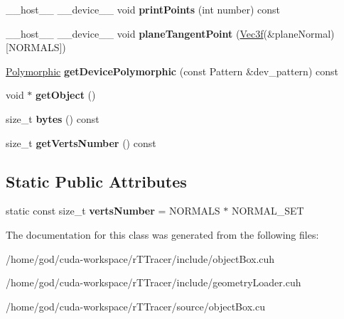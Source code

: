 \begin{DoxyCompactItemize}
\item 
\+\_\+\+\_\+host\+\_\+\+\_\+ \+\_\+\+\_\+device\+\_\+\+\_\+ void {\bfseries print\+Points} (int number) const\hypertarget{class_sphere_a80b41ffe0cbe37bc7a174e2e2c3cd12d}{}\label{class_sphere_a80b41ffe0cbe37bc7a174e2e2c3cd12d}

\item 
\+\_\+\+\_\+host\+\_\+\+\_\+ \+\_\+\+\_\+device\+\_\+\+\_\+ void {\bfseries plane\+Tangent\+Point} (\hyperlink{class_vec3}{Vec3f}(\&plane\+Normal)\mbox{[}N\+O\+R\+M\+A\+LS\mbox{]})\hypertarget{class_sphere_ae02b9577d4cfc6c2181caeafb6e7e09b}{}\label{class_sphere_ae02b9577d4cfc6c2181caeafb6e7e09b}

\item 
\hyperlink{struct_polymorphic}{Polymorphic} {\bfseries get\+Device\+Polymorphic} (const Pattern \&dev\+\_\+pattern) const\hypertarget{class_sphere_a3b912df967e257861160b74a11ae09ce}{}\label{class_sphere_a3b912df967e257861160b74a11ae09ce}

\item 
void $\ast$ {\bfseries get\+Object} ()\hypertarget{class_sphere_aa9a84f0893bc77fca4d9041f88bc40c3}{}\label{class_sphere_aa9a84f0893bc77fca4d9041f88bc40c3}

\item 
size\+\_\+t {\bfseries bytes} () const\hypertarget{class_sphere_a4653e693258cda646d795212b88d8104}{}\label{class_sphere_a4653e693258cda646d795212b88d8104}

\item 
size\+\_\+t {\bfseries get\+Verts\+Number} () const\hypertarget{class_sphere_a8381fa5f8257232a97614b155316b7eb}{}\label{class_sphere_a8381fa5f8257232a97614b155316b7eb}

\end{DoxyCompactItemize}
\subsection*{Static Public Attributes}
\begin{DoxyCompactItemize}
\item 
static const size\+\_\+t {\bfseries verts\+Number} = N\+O\+R\+M\+A\+LS $\ast$ N\+O\+R\+M\+A\+L\+\_\+\+S\+ET\hypertarget{class_sphere_af9d708c9b2804c3cac6b111da317c537}{}\label{class_sphere_af9d708c9b2804c3cac6b111da317c537}

\end{DoxyCompactItemize}


The documentation for this class was generated from the following files\+:\begin{DoxyCompactItemize}
\item 
/home/god/cuda-\/workspace/r\+T\+Tracer/include/object\+Box.\+cuh\item 
/home/god/cuda-\/workspace/r\+T\+Tracer/include/geometry\+Loader.\+cuh\item 
/home/god/cuda-\/workspace/r\+T\+Tracer/source/object\+Box.\+cu\end{DoxyCompactItemize}
